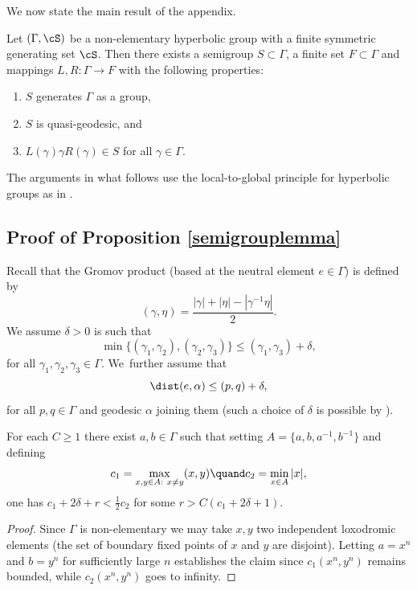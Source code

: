 We now state the main result of the appendix.

\begin{proposition}\label{semigrouplemma}
Let \((\Gamma,\cS)\) be a non-elementary hyperbolic group with a finite symmetric generating set \(\cS\). Then there exists a semigroup \(S \subset \Gamma\), a finite set \(F \subset \Gamma\) and mappings \(L,R:\Gamma \to F\) with the following properties:
\begin{enumerate}
\item \(S\) generates \(\Gamma\) as a group,
\item \(S\) is quasi-geodesic, and
\item \(L(\gamma)\gamma R(\gamma) \in S\) for all \(\gamma \in \Gamma\).
\end{enumerate}
\end{proposition}

The arguments in what follows use the local-to-global principle for hyperbolic groups as in \cite[\S 3]{gouezel}.

\subsection{Proof of Proposition \ref{semigrouplemma}}

Recall that the Gromov product (based at the neutral element \(e \in \Gamma\)) is defined by
\[
(\gamma,\eta) = \frac{|\gamma| + |\eta| - |\gamma^{-1}\eta|}{2}.
\]
We assume \(\delta > 0\) is such that
\[
\min\lbrace (\gamma_1,\gamma_2),(\gamma_2,\gamma_3)\rbrace \le (\gamma_1,\gamma_3) + \delta,
\]
for all \(\gamma_1,\gamma_2,\gamma_3 \in \Gamma\). We~further assume that
\[
\dist(e,\alpha) \le (p,q) + \delta,
\]
for all \(p,q \in \Gamma\) and geodesic \(\alpha\) joining them (such a choice of \(\delta\) is possible by \cite[Prop.\,1.22]{bridson-haefliger}).

\begin{lemma}
For each \(C \ge 1\) there exist \(a,b \in \Gamma\) such that setting \(A = \lbrace a,b,a^{-1},b^{-1}\rbrace\) and defining
\[
c_1 = \max_{x,y \in A:\ x \neq y}(x,y)\quand c_2 = \min_{x \in A}|x|,
\]
one has \(c_1 + 2\delta + r < \frac{1}{2}{c_2}\) for some \(r > C(c_1+2\delta+1)\).
\end{lemma}
\begin{proof}
Since \(\Gamma\) is non-elementary we may take \(x,y\) two independent loxodromic elements (\ie the set of boundary fixed points of \(x\) and \(y\) are disjoint).
Letting \(a = x^n\) and \(b = y^n\) for sufficiently large \(n\) establishes the claim since \(c_1(x^n,y^n)\) remains bounded, while \(c_2(x^n,y^n)\) goes to infinity.
\end{proof}

